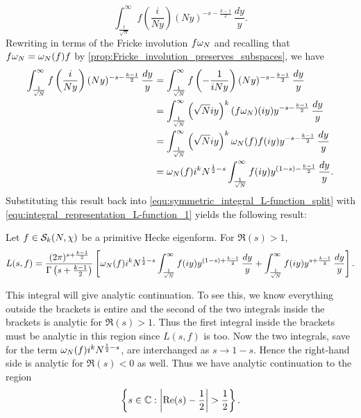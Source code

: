       \[
        \int_{\frac{1}{\sqrt{N}}}^{\infty}f\left(\frac{i}{Ny}\right)(Ny)^{-s-\frac{k-1}{2}}\,\frac{dy}{y}.
      \]
      Rewriting in terms of the Fricke involution $f\omega_{N}$ and recalling that $f\omega_{N} = \omega_{N}(f)f$ by \cref{prop:Fricke_involution_preserves_subspaces}, we have
      \begin{align*}
        \int_{\frac{1}{\sqrt{N}}}^{\infty}f\left(\frac{i}{Ny}\right)(Ny)^{-s-\frac{k-1}{2}}\,\frac{dy}{y} &= \int_{\frac{1}{\sqrt{N}}}^{\infty}f\left(-\frac{1}{iNy}\right)(Ny)^{-s-\frac{k-1}{2}}\,\frac{dy}{y} \\
        &= \int_{\frac{1}{\sqrt{N}}}^{\infty}\left(\sqrt{N}iy\right)^{k}(f\omega_{N})(iy)y^{-s-\frac{k-1}{2}}\,\frac{dy}{y} \\
        &= \int_{\frac{1}{\sqrt{N}}}^{\infty}\left(\sqrt{N}iy\right)^{k}\omega_{N}(f)f(iy)y^{-s-\frac{k-1}{2}}\,\frac{dy}{y} \\
        &= \omega_{N}(f)i^{k}N^{\frac{1}{2}-s}\int_{\frac{1}{\sqrt{N}}}^{\infty}f(iy)y^{(1-s)-\frac{k-1}{2}}\,\frac{dy}{y}.
      \end{align*}
      Substituting this result back into \cref{equ:symmetric_integral_L-function_split} with \cref{equ:integral_representation_L-function_1} yields the following result:
      \begin{theorem}
        Let $f \in \mathcal{S}_{k}(N,\chi)$ be a primitive Hecke eigenform. For $\Re(s) > 1$,
        \[
          L(s,f) = \frac{(2\pi)^{s+\frac{k-1}{2}}}{\Gamma\left(s+\frac{k-1}{2}\right)}\left[\omega_{N}(f)i^{k}N^{\frac{1}{2}-s}\int_{\frac{1}{\sqrt{N}}}^{\infty}f(iy)y^{(1-s)+\frac{k-1}{2}}\,\frac{dy}{y}+\int_{\frac{1}{\sqrt{N}}}^{\infty}f(iy)y^{s+\frac{k-1}{2}}\,\frac{dy}{y}\right].
        \]
      \end{theorem}

      This integral will give analytic continuation. To see this, we know everything outside the brackets is entire and the second of the two integrals inside the brackets is analytic for $\Re(s) > 1$. Thus the first integral inside the brackets must be analytic in this region since $L(s,f)$ is too. Now the two integrals, save for the term $\omega_{N}(f)i^{k}N^{\frac{1}{2}-s}$, are interchanged as $s \to 1-s$. Hence the right-hand side is analytic for $\Re(s) < 0$ as well. Thus we have analytic continuation to the region
      \[
        \left\{s \in \mathbb{C}:\left|\mathrm{Re}(s)-\frac{1}{2}\right| > \frac{1}{2}\right\}.
      \]

